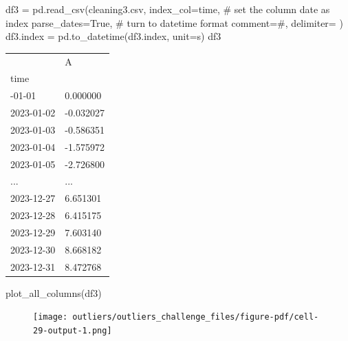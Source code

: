 \documentclass[
  letterpaper,
  DIV=11,
  numbers=noendperiod,
  oneside]{scrreprt}
\newenvironment{Shaded}{\begin{snugshade}}{\end{snugshade}}
\newcommand{\CommentTok}[1]{\textcolor[rgb]{0.37,0.37,0.37}{#1}}
\newcommand{\NormalTok}[1]{\textcolor[rgb]{0.00,0.23,0.31}{#1}}
\newcommand{\OperatorTok}[1]{\textcolor[rgb]{0.37,0.37,0.37}{#1}}
\newcommand{\StringTok}[1]{\textcolor[rgb]{0.13,0.47,0.30}{#1}}
\newcommand{\VariableTok}[1]{\textcolor[rgb]{0.07,0.07,0.07}{#1}}
\begin{document}
\begin{Shaded}
\begin{Highlighting}[]
\NormalTok{df3 }\OperatorTok{=}\NormalTok{ pd.read\_csv(}\StringTok{\textquotesingle{}cleaning3.csv\textquotesingle{}}\NormalTok{, }
\NormalTok{                  index\_col}\OperatorTok{=}\StringTok{\textquotesingle{}time\textquotesingle{}}\NormalTok{,     }\CommentTok{\# set the column date as index }
\NormalTok{                  parse\_dates}\OperatorTok{=}\VariableTok{True}\NormalTok{,     }\CommentTok{\# turn to datetime format}
\NormalTok{                  comment}\OperatorTok{=}\StringTok{\textquotesingle{}\#\textquotesingle{}}\NormalTok{, }
\NormalTok{                  delimiter}\OperatorTok{=}\StringTok{\textquotesingle{} \textquotesingle{}}\NormalTok{)}
\NormalTok{df3.index }\OperatorTok{=}\NormalTok{ pd.to\_datetime(df3.index, unit}\OperatorTok{=}\StringTok{\textquotesingle{}s\textquotesingle{}}\NormalTok{)}
\NormalTok{df3}
\end{Highlighting}
\end{Shaded}

\begin{longtable}[]{@{}ll@{}}
\toprule\noalign{}
& A \\
time & \\
\midrule\noalign{}
\endhead
\bottomrule\noalign{}
\endlastfoot
2023-01-01 & 0.000000 \\
2023-01-02 & -0.032027 \\
2023-01-03 & -0.586351 \\
2023-01-04 & -1.575972 \\
2023-01-05 & -2.726800 \\
... & ... \\
2023-12-27 & 6.651301 \\
2023-12-28 & 6.415175 \\
2023-12-29 & 7.603140 \\
2023-12-30 & 8.668182 \\
2023-12-31 & 8.472768 \\
\end{longtable}

\begin{Shaded}
\begin{Highlighting}[]
\NormalTok{plot\_all\_columns(df3)}
\end{Highlighting}
\end{Shaded}

\begin{figure}[H]

{\centering \texttt{[image: outliers/outliers\_challenge\_files/figure-pdf/cell-29-output-1.png]}

}

\end{figure}
\end{document}

